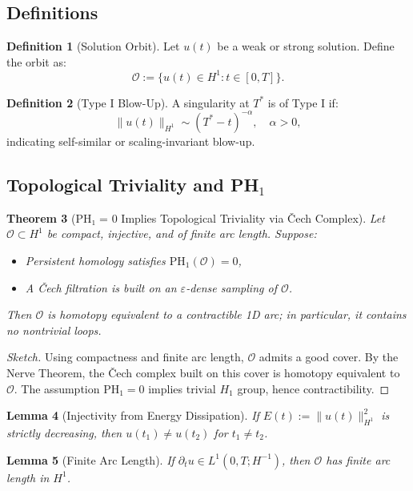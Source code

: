 \documentclass[11pt]{article}
\newtheorem{theorem}{Theorem}[section]
\newtheorem{lemma}[theorem]{Lemma}
\theoremstyle{definition}
\newtheorem{definition}[theorem]{Definition}
\begin{document}
\subsection{Definitions}

\begin{definition}[Solution Orbit]
Let $u(t)$ be a weak or strong solution. Define the orbit as:
\[
\mathcal{O} := \{u(t) \in H^1 : t \in [0,T]\}.
\]
\end{definition}

\begin{definition}[Type I Blow-Up]
A singularity at $T^*$ is of Type I if:
\[
\|u(t)\|_{H^1} \sim (T^* - t)^{-\alpha}, \quad \alpha > 0,
\]
indicating self-similar or scaling-invariant blow-up.
\end{definition}

\subsection{Topological Triviality and PH$_1$}

\begin{theorem}[PH₁ = 0 Implies Topological Triviality via Čech Complex]
\label{thm:cech-triviality}
Let $\mathcal{O} \subset H^1$ be compact, injective, and of finite arc length. Suppose:
\begin{itemize}
  \item Persistent homology satisfies $\mathrm{PH}_1(\mathcal{O}) = 0$,
  \item A Čech filtration is built on an $\varepsilon$-dense sampling of $\mathcal{O}$.
\end{itemize}
Then $\mathcal{O}$ is homotopy equivalent to a contractible 1D arc; in particular, it contains no nontrivial loops.
\end{theorem}

\begin{proof}[Sketch]
Using compactness and finite arc length, $\mathcal{O}$ admits a good cover. By the Nerve Theorem, the Čech complex built on this cover is homotopy equivalent to $\mathcal{O}$. The assumption $\mathrm{PH}_1 = 0$ implies trivial $H_1$ group, hence contractibility.
\end{proof}

\begin{lemma}[Injectivity from Energy Dissipation]
If $E(t) := \|u(t)\|^2_{H^1}$ is strictly decreasing, then $u(t_1) \neq u(t_2)$ for $t_1 \neq t_2$.
\end{lemma}

\begin{lemma}[Finite Arc Length]
If $\partial_t u \in L^1(0,T; H^{-1})$, then $\mathcal{O}$ has finite arc length in $H^1$.
\end{lemma}
\end{document}
